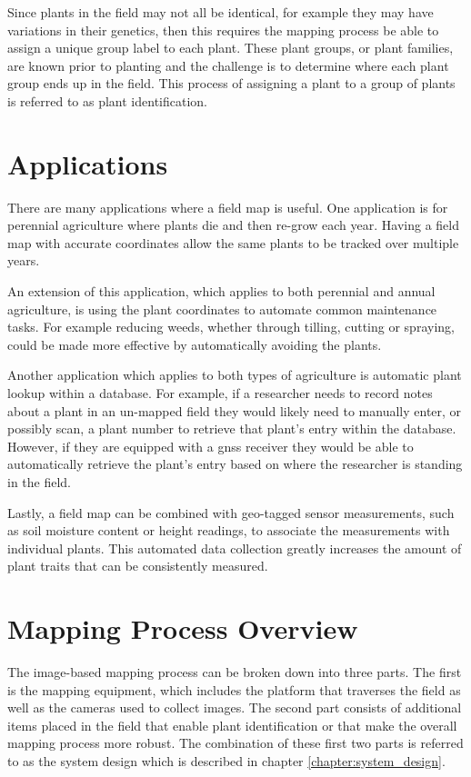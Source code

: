 Since plants in the field may not all be identical, for example they may have variations in their genetics, then this requires the mapping process be able to assign a unique group label to each plant.  These plant groups, or plant families, are known prior to planting and the challenge is to determine where each plant group ends up in the field.  This process of assigning a plant to a group of plants is referred to as plant identification.

\section{Applications}

There are many applications where a field map is useful.  One application is for perennial agriculture where plants die and then re-grow each year.  Having a field map with accurate coordinates allow the same plants to be tracked over multiple years.

An extension of this application, which applies to both perennial and annual agriculture, is using the plant coordinates to automate common maintenance tasks.  For example reducing weeds, whether through tilling, cutting or spraying, could be made more effective by automatically avoiding the plants.  

Another application which applies to both types of agriculture is automatic plant lookup within a database.  For example, if a researcher needs to record notes about a plant in an un-mapped field they would likely need to manually enter, or possibly scan, a plant number to retrieve that plant's entry within the database.  However, if they are equipped with a \ac{gnss} receiver they would be able to automatically retrieve the plant's entry based on where the researcher is standing in the field. 

Lastly, a field map can be combined with geo-tagged sensor measurements, such as soil moisture content or height readings, to associate the measurements with individual plants.  This automated data collection greatly increases the amount of plant traits that can be consistently measured.

\section{Mapping Process Overview} 

The image-based mapping process can be broken down into three parts.  The first is the mapping equipment, which includes the platform that traverses the field as well as the cameras used to collect images.  The second part consists of additional items placed in the field that enable plant identification or that make the overall mapping process more robust.  The combination of these first two parts is referred to as the system design which is described in chapter \ref{chapter:system_design}. 

